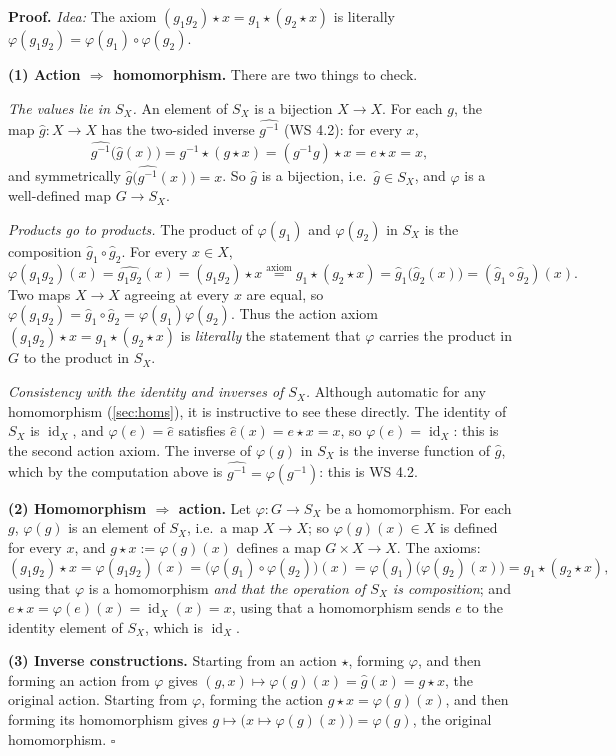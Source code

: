 \documentclass[11pt]{report}
\renewenvironment{proof}[1][Proof]{\noindent\textbf{#1.} }{\hfill$\square$\par\vspace{5pt}}
\begin{document}
\begin{proof}
\textit{Idea:} The axiom $(g_1g_2) \star x = g_1 \star (g_2 \star x)$ is literally $\varphi(g_1g_2) = \varphi(g_1) \circ \varphi(g_2)$.\par
\textbf{(1) Action $\Rightarrow$ homomorphism.} There are two things to check.

\emph{The values lie in $S_X$.} An element of $S_X$ is a bijection $X \to X$. For each $g$, the map $\hat g: X \to X$ has the two-sided inverse $\widehat{g^{-1}}$ (WS 4.2): for every $x$,
\[ \widehat{g^{-1}}\big(\hat g(x)\big) = g^{-1} \star (g \star x) = (g^{-1}g) \star x = e \star x = x, \]
and symmetrically $\hat g\big(\widehat{g^{-1}}(x)\big) = x$. So $\hat g$ is a bijection, i.e.\ $\hat g \in S_X$, and $\varphi$ is a well-defined map $G \to S_X$.

\emph{Products go to products.} The product of $\varphi(g_1)$ and $\varphi(g_2)$ in $S_X$ is the composition $\hat g_1 \circ \hat g_2$. For every $x \in X$,
\[ \varphi(g_1 g_2)(x) = \widehat{g_1 g_2}(x) = (g_1 g_2) \star x \overset{\text{axiom}}{=} g_1 \star (g_2 \star x) = \hat g_1\big(\hat g_2(x)\big) = (\hat g_1 \circ \hat g_2)(x). \]
Two maps $X \to X$ agreeing at every $x$ are equal, so $\varphi(g_1g_2) = \hat g_1 \circ \hat g_2 = \varphi(g_1)\varphi(g_2)$. Thus the action axiom $(g_1g_2) \star x = g_1 \star (g_2 \star x)$ is \emph{literally} the statement that $\varphi$ carries the product in $G$ to the product in $S_X$.

\emph{Consistency with the identity and inverses of $S_X$.} Although automatic for any homomorphism (\ref{sec:homs}), it is instructive to see these directly. The identity of $S_X$ is $\operatorname{id}_X$, and $\varphi(e) = \hat e$ satisfies $\hat e(x) = e \star x = x$, so $\varphi(e) = \operatorname{id}_X$: this is the second action axiom. The inverse of $\varphi(g)$ in $S_X$ is the inverse function of $\hat g$, which by the computation above is $\widehat{g^{-1}} = \varphi(g^{-1})$: this is WS 4.2.

\textbf{(2) Homomorphism $\Rightarrow$ action.} Let $\varphi: G \to S_X$ be a homomorphism. For each $g$, $\varphi(g)$ is an element of $S_X$, i.e.\ a map $X \to X$; so $\varphi(g)(x) \in X$ is defined for every $x$, and $g \star x := \varphi(g)(x)$ defines a map $G \times X \to X$. The axioms:
\[ (g_1g_2) \star x = \varphi(g_1g_2)(x) = \big(\varphi(g_1) \circ \varphi(g_2)\big)(x) = \varphi(g_1)\big(\varphi(g_2)(x)\big) = g_1 \star (g_2 \star x), \]
using that $\varphi$ is a homomorphism \emph{and that the operation of $S_X$ is composition}; and $e \star x = \varphi(e)(x) = \operatorname{id}_X(x) = x$, using that a homomorphism sends $e$ to the identity element of $S_X$, which is $\operatorname{id}_X$.

\textbf{(3) Inverse constructions.} Starting from an action $\star$, forming $\varphi$, and then forming an action from $\varphi$ gives $(g, x) \mapsto \varphi(g)(x) = \hat g(x) = g \star x$, the original action. Starting from $\varphi$, forming the action $g \star x = \varphi(g)(x)$, and then forming its homomorphism gives $g \mapsto \big(x \mapsto \varphi(g)(x)\big) = \varphi(g)$, the original homomorphism.
\end{proof}
\end{document}
